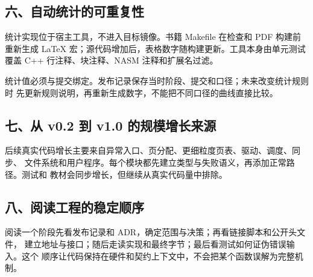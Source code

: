 \subsection{六、自动统计的可重复性}

统计实现位于宿主工具，不进入目标镜像。书籍 Makefile 在检查和 PDF 构建前
重新生成 LaTeX 宏；源代码增加后，表格数字随构建更新。工具本身由单元测试
覆盖 C++ 行注释、块注释、NASM 注释和扩展名过滤。

统计值必须与提交绑定。发布记录保存当时阶段、提交和口径；未来改变统计规则时
先更新规则说明，再重新生成数字，不能把不同口径的曲线直接比较。

\subsection{七、从 v0.2 到 v1.0 的规模增长来源}

后续真实代码增长主要来自异常入口、页分配、更细粒度页表、驱动、调度、同步、
文件系统和用户程序。每个模块都先建立类型与失败语义，再添加正常路径。测试和
教材会同步增长，但继续从真实代码量中排除。

\subsection{八、阅读工程的稳定顺序}

阅读一个阶段先看发布记录和 ADR，确定范围与决策；再看链接脚本和公开头文件，
建立地址与接口；随后走读实现和最终字节；最后看测试如何证伪错误输入。这个
顺序让代码保持在硬件和契约上下文中，不会把某个函数误解为完整机制。
